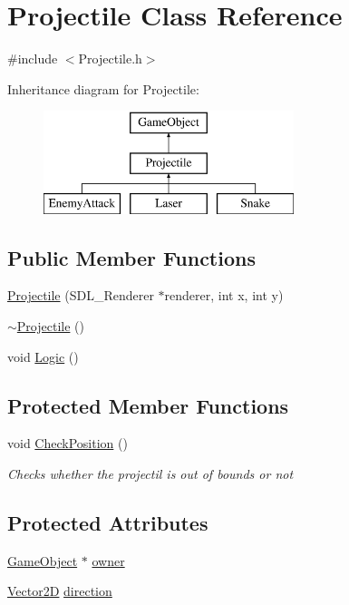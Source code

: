 \hypertarget{class_projectile}{}\section{Projectile Class Reference}
\label{class_projectile}


{\ttfamily \#include $<$Projectile.\+h$>$}

Inheritance diagram for Projectile\+:\begin{figure}[H]
\begin{center}
\leavevmode
\includegraphics[height=3.000000cm]{class_projectile}
\end{center}
\end{figure}
\subsection*{Public Member Functions}
\begin{DoxyCompactItemize}
\item 
\mbox{\hyperlink{class_projectile_a0906140caebe54c0b087c7e6240f3084}{Projectile}} (S\+D\+L\+\_\+\+Renderer $\ast$renderer, int x, int y)
\item 
\mbox{\hyperlink{class_projectile_a94903e021fa2edab60ba3836ca0b937d}{$\sim$\+Projectile}} ()
\item 
void \mbox{\hyperlink{class_projectile_a871e265207d2bf2d5180152a7acf2d40}{Logic}} ()
\end{DoxyCompactItemize}
\subsection*{Protected Member Functions}
\begin{DoxyCompactItemize}
\item 
void \mbox{\hyperlink{class_projectile_a6baf0fc9681b7c13b64a1c82671e296f}{Check\+Position}} ()
\begin{DoxyCompactList}\small\item\em Checks whether the projectil is out of bounds or not \end{DoxyCompactList}\end{DoxyCompactItemize}
\subsection*{Protected Attributes}
\begin{DoxyCompactItemize}
\item 
\mbox{\hyperlink{class_game_object}{Game\+Object}} $\ast$ \mbox{\hyperlink{class_projectile_a1a76b3677c7be9a072e7097c34adc517}{owner}}
\item 
\mbox{\hyperlink{struct_game_object_1_1_vector2_d}{Vector2D}} \mbox{\hyperlink{class_projectile_a0e4b335bd16e41ec9f8b2f6b8006cac8}{direction}}
\end{DoxyCompactItemize}
